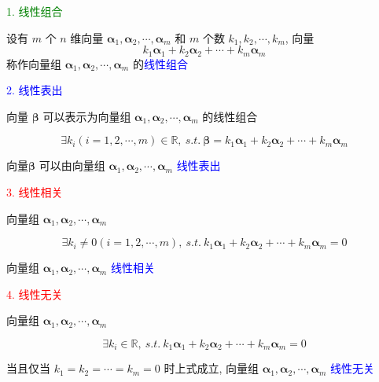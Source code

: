 \begin{definition}[线性相关和线性表出]
	\textcolor{green}{1. 线性组合}
	
	设有 $m$ 个 $n$ 维向量 $\boldsymbol{\alpha}_{1}, \boldsymbol{\alpha}_{2}, \cdots, \boldsymbol{\alpha}_{m}$ 和 $m$ 个数 $k_{1},k_{2},\cdots,k_{m}$, 向量
	$$k_{1}\boldsymbol{\alpha}_{1}+k_{2}\boldsymbol{\alpha}_{2}+\cdots+k_{m}\boldsymbol{\alpha}_{m}$$
	称作向量组 $\boldsymbol{\alpha}_{1},\boldsymbol{\alpha}_{2}, \cdots, \boldsymbol{\alpha}_{m}$ 的\textcolor{blue}{线性组合}
	
	\textcolor{blue}{2. 线性表出}
	
	向量 $\boldsymbol{\beta}$ 可以表示为向量组 $\boldsymbol{\alpha}_{1}, \boldsymbol{\alpha}_{2}, \cdots, \boldsymbol{\alpha}_{m}$ 的线性组合
	
	$$\exists k_{i}(i = 1,2,\cdots,m)\in  \mathbb{R},\ s.t.\ \boldsymbol{\beta} = k_{1}\boldsymbol{\alpha}_{1} + k_{2}\boldsymbol{\alpha}_{2} + \cdots + k_{m}\boldsymbol{\alpha}_{m}$$

	向量$\boldsymbol{\beta}$ 可以由向量组 $\boldsymbol{\alpha}_{1}, \boldsymbol{\alpha}_{2}, \cdots, \boldsymbol{\alpha}_{m}$ \textcolor{blue}{线性表出}
	
	\textcolor{red}{3. 线性相关}
	
	向量组 $\boldsymbol{\alpha}_{1}, \boldsymbol{\alpha}_{2}, \cdots, \boldsymbol{\alpha}_{m}$

	$$\exists k_{i}\neq 0(i=1,2,\cdots,m), \ s.t. \ k_{1}\boldsymbol{\alpha}_{1} + k_{2}\boldsymbol{\alpha}_{2} + \cdots + k_{m}\boldsymbol{\alpha}_{m} = 0$$
	
	向量组 $\boldsymbol{\alpha}_{1}, \boldsymbol{\alpha}_{2}, \cdots, \boldsymbol{\alpha}_{m}$ \textcolor{blue}{线性相关}
	
	\textcolor{red}{4. 线性无关}
	
	向量组 $\boldsymbol{\alpha}_{1}, \boldsymbol{\alpha}_{2}, \cdots, \boldsymbol{\alpha}_{m}$

	$$\exists k_{i}\in \mathbb{R},\ s.t.\ k_{1}\boldsymbol{\alpha}_{1} + k_{2}\boldsymbol{\alpha}_{2} + \cdots + k_{m}\boldsymbol{\alpha}_{m} = 0$$

	当且仅当 $k_{1}=k_{2}=\cdots=k_{m}=0$ 时上式成立, 向量组 $\boldsymbol{\alpha}_{1}, \boldsymbol{\alpha}_{2}, \cdots, \boldsymbol{\alpha}_{m}$ \textcolor{blue}{线性无关}
\end{definition}

